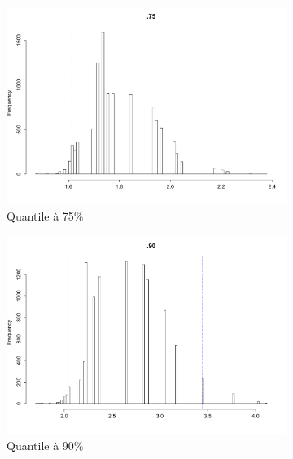 \documentclass{article}
\renewcommand*{\(}{ \left( }
\renewcommand*{\)}{ \right) }
\begin{document}
\begin{figure}[H]
    \centering
    \begin{subfigure}[t]{0.3\textwidth}
        \includegraphics[width = \linewidth]{img/BootstrapNaif-75-100.pdf}
        \caption{Quantile à 75\%}
        \label{fig:naifcB75}
    \end{subfigure}%
    \begin{subfigure}[t]{0.3\textwidth}
        \includegraphics[width = \linewidth]{img/BootstrapNaif-90-100.pdf}
        \caption{Quantile à 90\%}
        \label{naifcB90}
    \end{subfigure}%
    \begin{subfigure}[t]{0.3\textwidth}

\end{subfigure}
\end{figure}
\end{document}
